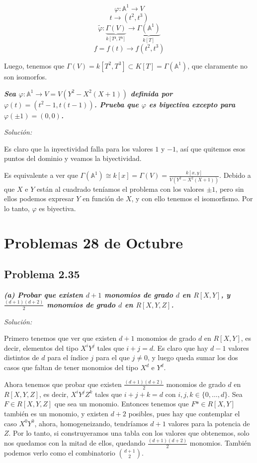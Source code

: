 $$  \varphi:\mathbb{A}^1\rightarrow V $$
$$ t \rightarrow (t^2,t^3)$$
$$\tilde{\varphi}:\underbrace{\Gamma(V)}_{k[T²,T³]}\rightarrow \underbrace{\Gamma(\mathbb{A}^1)}_{k[T]}$$
$$f=f(t)\rightarrow f(t^2,t^3)$$

Luego, tenemos que $\Gamma(V)=k[T^2,T^3]\subset K[T]=\Gamma(\mathbb{A}^1)$, que claramente no son isomorfos.
\vspace{2mm}

\textit{\textbf{Sea $\varphi:\mathbb{A}^1\rightarrow V=V(Y^2-X^2(X+1))$ definida por $\varphi(t)=(t^2-1,t(t-1))$. Prueba que $\varphi$ es biyectiva excepto para $\varphi(\pm 1)=(0,0)$.}}

\textit{Solución: }


Es claro que la inyectividad falla para los valores $1$ y $-1$, así que quitemos esos puntos del dominio y veamos la biyectividad.

Es equivalente a ver que $\Gamma(\mathbb{A}^1)\cong k[x]=\Gamma(V)=\frac{k[x,y]}{V(Y^2-X^2(X+1))}$. Debido a que $X$ e $Y$ están al cuadrado teníamos el problema con los valores $\pm 1$, pero sin ellos podemos expresar $Y$ en función de $X$, y con ello tenemos el isomorfismo. Por lo tanto, $\varphi $ es biyectiva.
\newpage

\section{Problemas 28 de Octubre}

\subsection{Problema 2.35}

\textit{\textbf{(a) Probar que existen $d+1$ monomios de grado $d$ en $R[X,Y]$, y $\frac{(d+1)(d+2)}{2}$ monomios de grado $d$ en $R[X,Y,Z]$.}}

\textit{Solución: }

Primero tenemos que ver que existen $d+1$ monomios de grado $d$ en $R[X,Y]$, es decir, elementos del tipo $X^iY^j$ tales que $i+j=d$. Es claro que hay $d-1$ valores distintos de $d$ para el índice $j$ para el que $j\neq 0$, y luego queda sumar los dos casos que faltan de tener monomios del tipo $X^d$ e $Y^d$.

Ahora tenemos que probar que existen $\frac{(d+1)(d+2)}{2}$ monomios de grado $d$ en $R[X,Y,Z]$, es decir, $X^iY^jZ^k$ tales que $i+j+k=d$ con $i,j,k\in \{0,\dots,d\}$. Sea $F\in R[X,Y,Z]$ que sea un monomio. Entonces tenemos que $F*\in R[X,Y]$ también es un monomio, y existen $d+2$ posibles, pues hay que contemplar el caso $X^0Y^0$, ahora, homogeneizando, tendríamos $d+1$ valores para la potencia de $Z$. Por lo tanto, si construyeramos una tabla con los valores que obtenemos, solo nos quedamos con la mitad de ellos, quedando $\frac{(d+1)(d+2)}{2}$ monomios. También podemos verlo como el combinatorio ${d+1 \choose 2}$.

